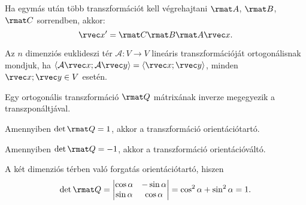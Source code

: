\documentclass[a4paper, 12pt]{scrartcl}
\begin{document}
\begin{note}
  Ha egymás után több transzformációt kell végrehajtani $\rmat A$,
  $\rmat B$, $\rmat C$ sorrendben, akkor:
  $$
    \rvec x' = \rmat C \rmat B \rmat A \rvec x
    \text.
  $$
\end{note}

\begin{definition}
  Az $n$ dimenziós  euklideszi tér $\mathcal A: V \rightarrow V$ lineáris
  transzformációját ortogonálisnak mondjuk, ha $\langle \mathcal A \rvec x;
    \mathcal A \rvec y \rangle = \langle \rvec x; \rvec y \rangle$, minden $\rvec
    x; \rvec y \in V$ esetén.
\end{definition}

\begin{note}
  Egy ortogonális transzformáció $\rmat Q$ mátrixának inverze megegyezik a
  transzponáltjával.

  Amennyiben $\det \rmat Q = 1$, akkor a transzformáció orientációtartó.

  Amennyiben $\det \rmat Q = -1$, akkor a transzformáció orientációváltó.
\end{note}

\begin{example}
  A két dimenziós térben való forgatás orientációtartó, hiszen
  $$
    \det \rmat Q
    = \begin{vmatrix}
      \cos \alpha & -\sin \alpha \\
      \sin \alpha & \cos \alpha
    \end{vmatrix}
    = \cos^2 \alpha + \sin^2 \alpha
    = 1
    \text.
  $$
\end{example}

\clearpage
\end{document}
